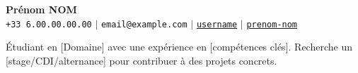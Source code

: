 \begin{center}
    \textbf{\Huge Prénom NOM} \\ \vspace{5pt}
    \small
    \faPhone* \texttt{+33 6.00.00.00.00} \hspace{1pt} $|$
    \hspace{1pt} \faEnvelope \hspace{2pt} \texttt{email@example.com} \hspace{1pt} $|$
    \hspace{1pt} \faGithub \hspace{2pt}
    \href{https://github.com/username}{\texttt{username}} \hspace{1pt} $|$
    \hspace{1pt} \faLinkedin \hspace{2pt}
    \href{https://www.linkedin.com/in/prenom-nom/}{\texttt{prenom-nom}}
    \\ \vspace{-10pt}
\end{center}

\vspace{-6pt}

\begin{center}
\small{
Étudiant en [Domaine] avec une expérience en [compétences clés]. Recherche un [stage/CDI/alternance] pour contribuer à des projets concrets.
}
\end{center}

\vspace{-10pt}
